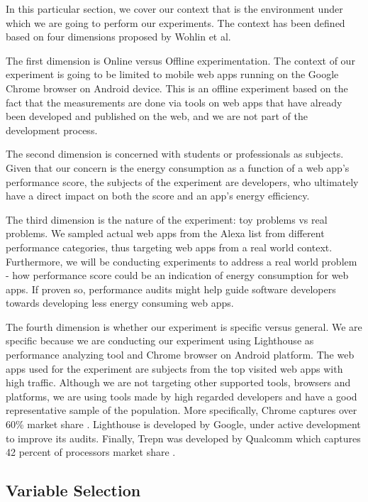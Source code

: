 In this particular section, we cover our context that is the environment under which we are going to perform our experiments. The context has been defined based on four dimensions proposed by Wohlin et al. \cite{Book:Exp}

The first dimension is Online versus Offline experimentation. The context of our experiment is going to be limited to mobile web apps running on the Google Chrome browser on Android device. This is an offline experiment based on the fact that the measurements are done via tools on web apps that have already been developed and published on the web, and we are not part of the development process.

The second dimension is concerned with students or professionals as subjects. Given that our concern is the energy consumption as a function of a web app's performance score, the subjects of the experiment are developers, who ultimately have a direct impact on both the score and an app's energy efficiency.

The third dimension is the nature of the experiment: toy problems vs real problems. We sampled actual web apps from the Alexa list from different performance categories, thus targeting web apps from a real world context. Furthermore, we will be conducting experiments to address a real world problem - how performance score could be an indication of energy consumption for web apps. If proven so, performance audits might help guide software developers towards developing less energy consuming web apps.

 The fourth dimension is whether our experiment is specific versus general. We are specific because we are conducting our experiment using Lighthouse as performance analyzing tool and Chrome browser on Android platform. The web apps used for the experiment are subjects from the top visited web apps with high traffic. Although we are not targeting other supported tools, browsers and platforms, we are using tools made by high regarded developers and have a good representative sample of the population. More specifically, Chrome captures over 60\% market share \cite{WEBSITE:16}. Lighthouse is developed by Google, under active development to improve its audits. Finally, Trepn was developed by Qualcomm which captures 42 percent of processors market share \cite{WEBSITE:17}. \newline


\subsection{Variable Selection}

